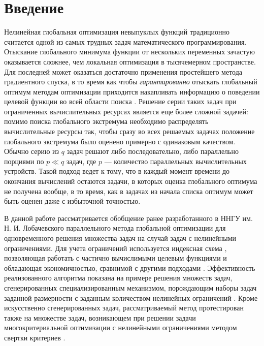 \documentclass{cmi}
\begin{document}
\section*{Введение}
\label{sec-intro}
Нелинейная глобальная оптимизация невыпуклых функций традиционно считается одной из самых трудных
задач математического программирования. Отыскание глобального минимума функции от нескольких переменных
зачастую оказывается сложнее, чем локальная оптимизация в тысячемерном пространстве. Для последней может оказаться достаточно
применения простейшего метода градиентного спуска, в то время как чтобы \textit{гарантированно} отыскать глобальный оптимум методам
оптимизации приходится накапливать информацию о поведении целевой функции во всей области поиска \cite{Jones2009,Paulavicius2011,Evtushenko2013,Strongin2000}. Решение серии таких задач при ограниченных вычислительных
ресурсах является еще более сложной задачей: помимо поиска глобального экстремума необходимо
распределять вычислительные ресурсы так, чтобы сразу во всех решаемых задачах положение глобального
экстремума было оценено примерно с одинаковым качеством. Обычно серию из \(q\) задач решают либо последовательно, либо
параллельно порциями по \(p\ll q\) задач, где \(p\) --- количество параллельных вычислительных устройств.
Такой подход ведет к тому, что в каждый момент времени до окончания вычислений
остаются задачи, в которых оценка глобального оптимума не получена вообще, в то время, как в задачах из начала
списка оптимум может быть оценен даже с избыточной точностью.

В данной работе рассматривается обобщение ранее разработанного в ННГУ им. Н. И. Лобачевского
параллельного метода глобальной оптимизации для одновременного решения множества задач \cite{BarkalovStrongin2018} на
случай задач с нелинейными ограничениями. Для учета ограничений используется индексная схема \cite{Strongin2000},
позволяющая работать с частично вычислимыми целевым функциями и обладающая экономичностью,
сравнимой с другими подходами \cite{BarkalovLebedev2017}. Эффективность реализованного
алгоритма показана на примере решения множеств задач, сгенерированных специализированным
механизмом, порождающим наборы задач заданной размерности с заданным количеством нелинейных ограничений \cite{GergelBarkalov2019}.
Кроме искусственно сгенерированных задач, рассматриваемый метод протестирован также
на множестве задач, возникающем при решении задачи многокритериальной оптимизации
с нелинейными ограничениями методом свертки критериев \cite{Ehrgott2005}.
\end{document}
